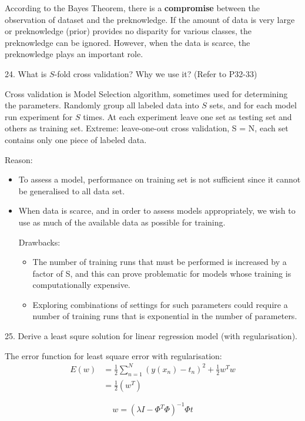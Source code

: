 \documentclass[11pt,a4paper]{article}
\newcommand{\BOLD}[1]{\textbf{#1}}
\newcommand{\half}{\frac{1}{2}}
\begin{document}
    According to the Bayes Theorem, there is a \BOLD{compromise} between the observation of dataset and the preknowledge. If the amount of data is very large or preknowledge (prior) provides no disparity for various classes, the preknowledge can be ignored. However, when the data is scarce, the preknowledge plays an important role.

    24. What is $S$-fold cross validation? Why we use it? (Refer to P32-33)
    
    Cross validation is Model Selection algorithm, sometimes used for determining the parameters. Randomly group all labeled data into $S$ sets, and for each model run experiment for $S$ times. At each experiment leave one set as testing set and others as training set. Extreme: leave-one-out cross validation, S = N, each set contains only one piece of labeled data.

    Reason: 
    \begin{itemize}
    \item To assess a model, performance on training set is not sufficient since it cannot be generalised to all data set.
    \item When data is scarce, and in order to assess models appropriately, we wish to use as much of the available data as possible for training.

    Drawbacks:
    \begin{itemize}
    \item The number of training runs that must be performed is increased by a factor of S, and this can prove problematic for models whose training is computationally expensive.
    \item Exploring combinations of settings for such parameters could require a number of training runs that is exponential in the number of parameters.
    \end{itemize}
\end{itemize}


25. Derive a least squre solution for linear regression model (with regularisation).
    
    The error function for least square error with regularisation:
    \begin{align}
        E(w) &= \half \sum_{n=1}^{N} (y(x_n) - t_n)^2 + \half w^T w \\
             &= \half ( w^T )
    \end{align}

    $$
    w = (\lambda I - \Phi^T \Phi)^{-1} \Phi t
    $$
\end{document}
